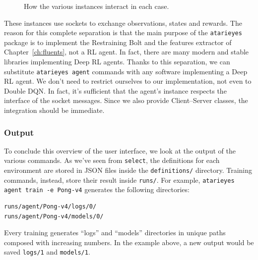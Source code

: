 \begin{figure}[p]
{
	}
	\caption{How the various instances interact in each case.}
	\label{fig:cmd-instances}
\end{figure}

These instances use sockets to exchange observations, states and rewards. The
reason for this complete separation is that the main purpose of the
\texttt{atarieyes} package is to implement the Restraining Bolt and the
features extractor of Chapter~\ref{ch:fluents}, not a RL agent. In fact, there
are many modern and stable libraries implementing Deep RL agents. Thanks to
this separation, we can substitute \texttt{atarieyes agent} commands with any
software implementing a Deep RL agent. We don't need to restrict ourselves to
our implementation, not even to Double DQN. In fact, it's sufficient that the
agent's instance respects the interface of the socket messages. Since we also
provide Client--Server classes, the integration should be immediate.


\subsubsection*{Output}

To conclude this overview of the user interface, we look at the output of the 
various commands. As we've seen from \texttt{select}, the definitions for each
environment are stored in JSON files inside the \texttt{definitions/}
directory. Training commands, instead, store their result inside
\texttt{runs/}. For example,
\verb|atarieyes agent train -e Pong-v4| 
generates the following directories:
\begin{lstlisting}
runs/agent/Pong-v4/logs/0/
runs/agent/Pong-v4/models/0/
\end{lstlisting}
Every training generates ``logs'' and ``models'' directories in
unique paths composed with increasing numbers. In the example above, a new
output would be saved \verb|logs/1| and \verb|models/1|.

